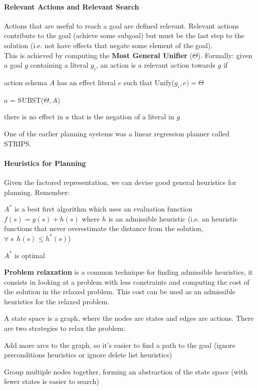 \documentclass[10pt]{report}
\begin{document}
\paragraph{Relevant Actions and Relevant Search} Actions that are useful to reach a goal are defined relevant. Relevant actions contribute to the goal (achieve some subgoal) but must be the last step to the solution (i.e. not have effects that negate some element of the goal).\\
This is achieved by computing the \textbf{Most General Unifier} ($\Theta$). Formally: given a goal $g$ containing a literal $g_i$, an action is a relevant action towards $g$ if
\begin{list}{}{}
	\item action schema $A$ has an effect literal $e$ such that Unify($g_i,e)=\Theta$
	\item $a$ = SUBST($\Theta, A$)
	\item there is no effect in $a$ that is the negation of a literal in $g$
\end{list}
One of the earlier planning systems was a linear regression planner called STRIPS.
\paragraph{Heuristics for Planning} Given the factored representation, we can devise good general heuristics for planning. Remember:
\begin{list}{}{}
	\item $A^*$ is a best first algorithm which uses an evaluation function $f(s) = g(s) + h(s)$ where $h$ is an admissible heuristic (i.e. an heuristic functions that never overestimate the distance from the solution, $\forall\:s\:\:h(s)\leq h^*(s)$)
	\item $A^*$ is optimal
	\item \textbf{Problem relaxation} is a common technique for finding admissible heuristics, it consists in looking at a problem with less constraints and computing the cost of the solution in the relaxed problem. This cost can be used as an admissible heuristics for the relaxed problem.
\end{list}
A state space is a graph, where the nodes are states and edges are actions. There are two strategies to relax the problem:
\begin{list}{}{}
	\item Add more arcs to the graph, so it's easier to find a path to the goal (ignore preconditions heuristics or ignore delete list heuristics)
	\item Group multiple nodes together, forming an abstraction of the state space (with fewer states is easier to search)
\end{list}
\end{document}
